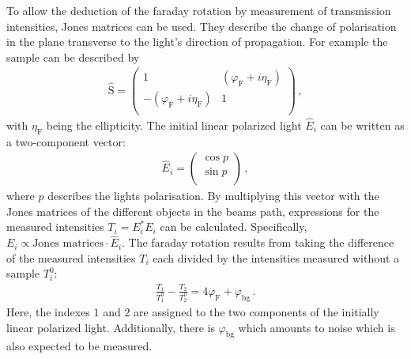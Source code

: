 	To allow the deduction of the faraday rotation by measurement of transmission intensities, Jones matrices can be used.
	They describe the change of polarisation in the plane transverse to the light's direction of propagation.
	For example the sample can be described by
	\begin{align*}
		\hat{\text{S}} = \left( \begin{array}{rr}
		1 & (\varphi_\text{F} + i\eta_\text{F}) \\
		-(\varphi_\text{F} + i\eta_\text{F}) & 1 \\
	\end{array}\right) \,,
	\end{align*}
  with $\eta_\text{F}$ being the ellipticity.
	The initial linear polarized light $\hat{E}_i$ can be written as a two-component vector:
	\begin{align*}
		\hat{E}_i = \left( \begin{array}{r}
					\cos{p} \\
					\sin{p} \\
				\end{array}\right) \,,
	\end{align*}
	where $p$ describes the lights polarisation.
	By multiplying this vector with the Jones matrices of the different objects in the beams path, expressions for the measured intensities $T_i = E_i^* E_i$ can be calculated.
  Specifically, $E_i \propto \text{Jones matrices} \cdot \hat{E}_i$.
  The faraday rotation results from taking the difference of the measured intensities $T_i$ each divided by the intensities measured without a sample $T_i^0$:
	\begin{align*}
		\frac{T_1}{T_1^0} - \frac{T_2}{T_2^0} = 4 \varphi_\text{F} + \varphi_\text{bg} \,.
	\end{align*}
	Here, the indexes $1$ and $2$ are assigned to the two components of the initially linear polarized light.
	Additionally, there is $\varphi_\text{bg}$ which amounts to noise which is also expected to be measured.
